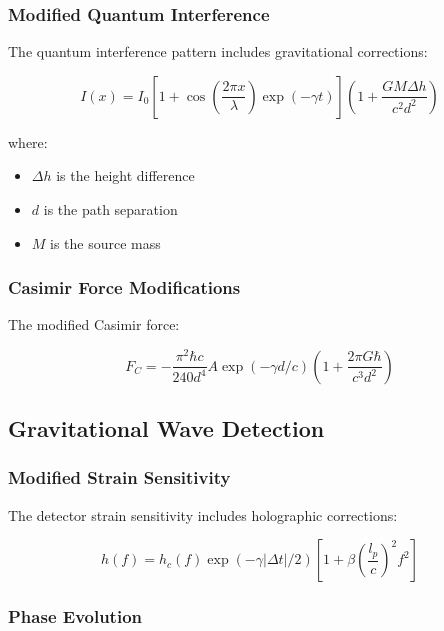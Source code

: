 \documentclass[12pt]{article}
\theoremstyle{plain}
\theoremstyle{definition}
\theoremstyle{remark}
\begin{document}
\subsubsection{Modified Quantum Interference}

The quantum interference pattern includes gravitational corrections:

\begin{equation}
I(x) = I_0\left[1 + \cos\left(\frac{2\pi x}{\lambda}\right)\exp(-\gamma t)\right]\left(1 + \frac{GM\Delta h}{c^2d^2}\right)
\end{equation}

where:
\begin{itemize}
\item $\Delta h$ is the height difference
\item $d$ is the path separation
\item $M$ is the source mass
\end{itemize}

\subsubsection{Casimir Force Modifications}

The modified Casimir force:

\begin{equation}
F_C = -\frac{\pi^2\hbar c}{240d^4}A\exp(-\gamma d/c)\left(1 + \frac{2\pi G\hbar}{c^3d^2}\right)
\end{equation}

\subsection{Gravitational Wave Detection}

\subsubsection{Modified Strain Sensitivity}

The detector strain sensitivity includes holographic corrections:

\begin{equation}
h(f) = h_c(f)\exp(-\gamma|\Delta t|/2)\left[1 + \beta\left(\frac{l_p}{c}\right)^2f^2\right]
\end{equation}

\subsubsection{Phase Evolution}
\end{document}
